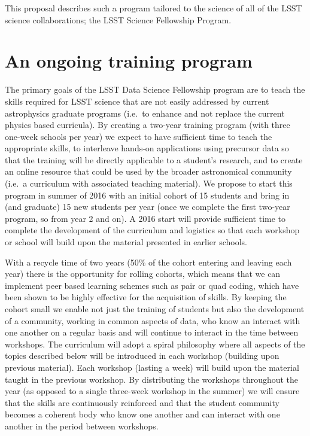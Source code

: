 \documentclass[nofootbib,floatfix,11pt]{article}
\begin{document}
This proposal describes such a program tailored to the science of all of the LSST science collaborations; the LSST Science Fellowship Program. 


\section{An ongoing training program}

The primary goals of the LSST Data Science Fellowship program are to teach the skills required for LSST science that are not easily addressed by current astrophysics graduate programs (i.e.\ to enhance and not replace the current physics based curricula). By creating a two-year training program (with three one-week schools per year) we expect to have sufficient time to teach the appropriate skills, to interleave hands-on applications using precursor data so that the training will be directly applicable to a student's research, and to create an online resource that could be used by the broader astronomical community (i.e.\ a curriculum with associated teaching material).  We propose to start this program in summer of 2016 with an initial cohort of 15 students and bring in (and graduate) 15 new students per year (once we complete the first two-year program, so from year 2 and on). A 2016 start will provide sufficient time to complete the development of the curriculum and logistics so that each workshop or school will build upon the material presented in earlier schools.

With a recycle time of two years (50\% of the cohort entering and leaving each year) there is the opportunity for rolling cohorts, which means that we can implement peer based learning schemes such as pair or quad coding, which have been shown to be highly effective for the acquisition of skills. By keeping the cohort small we enable not just the training of students but also the development of a community, working in common aspects of data, who know an interact with one another on a regular basis and will continue to interact in the time between workshops.  The curriculum will adopt a spiral philosophy where all aspects of the topics described below will be introduced in each workshop (building upon previous material). Each workshop (lasting a week) will build upon the material taught in the previous workshop. By distributing the workshops throughout the year (as opposed to a single three-week workshop in the summer) we will ensure that the skills are continuously reinforced and that the student community becomes a coherent body who know one another and can interact with one another in the period between workshops. 
\end{document}
